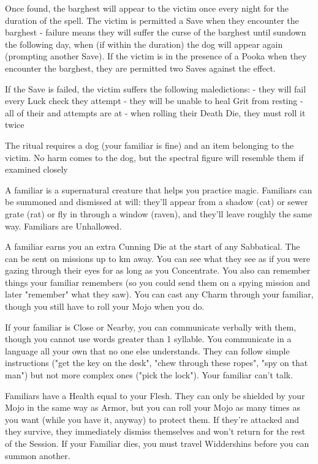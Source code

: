 {Once found, the barghest will appear to the victim once every night for the duration of the spell.  The victim is permitted a Save when they encounter the barghest - failure means they will suffer the curse of the barghest until sundown the following day, when (if within the duration) the dog will appear again (prompting another Save).  If the victim is in the presence of a Pooka when they encounter the barghest, they are permitted two Saves against the effect.

If the Save is failed, the victim suffers the following maledictions:
- they will fail every Luck check they attempt
- they will be unable to heal Grit from resting
- all of their \RO and \RB attempts are at \DCDOWN
- when rolling their Death Die, they must roll it twice

The ritual requires a dog (your familiar is fine) and an item belonging to the victim.  No harm comes to the dog, but the spectral figure will resemble them if examined closely


\OCCULT[
  Name=Bind Familiar,
  Link=occultism-bind-familiar,
  Success=1,
  Cost=666,
  Widdershins=1
]


A familiar is a supernatural creature that helps you practice magic.  Familiars can be summoned and dismissed at will: they'll appear from a shadow (cat) or sewer grate (rat) or fly in through a window (raven), and they'll leave roughly the same way.  Familiars are Unhallowed.

A familiar earns you an extra Cunning Die at the start of any Sabbatical.  The can be sent on missions up to \LVL km away.  You can see what they see as if you were gazing through their eyes for as long as you Concentrate. You also can remember things your familiar remembers (so you could send them on a spying mission and later "remember" what they saw). You can cast any Charm through your familiar, though you still have to roll your Mojo when you do.  

If your familiar is Close or Nearby, you can communicate verbally with them, though you cannot use words greater than 1 syllable.  You communicate in a language all your own that no one else understands.  They can follow simple instructions ("get the key on the desk", "chew through these ropes", "spy on that man") but not more complex ones ("pick the lock").  Your familiar can't talk.

Familiars have a Health equal to your Flesh.  They can only be shielded by your Mojo in the same way as Armor, but you can roll your Mojo as many times as you want (while you have it, anyway) to protect them.  If they're attacked and they survive, they immediately dismiss themselves and won't return for the rest of the Session. If your Familiar dies, you must travel Widdershins before you can summon another.  

}
